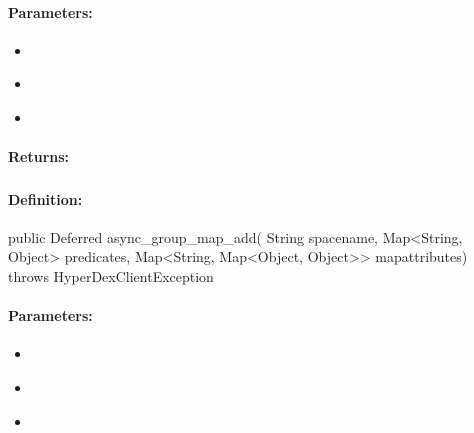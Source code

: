 \paragraph{Parameters:}
\begin{itemize}[noitemsep]
\item {}\\

\item {}\\

\item {}\\

\end{itemize}

\paragraph{Returns:}


\pagebreak
\subsubsection{}
\label{api:java:async_group_map_add}


\paragraph{Definition:}
\begin{javacode}
public Deferred async_group_map_add(
        String spacename,
        Map<String, Object> predicates,
        Map<String, Map<Object, Object>> mapattributes) throws HyperDexClientException
\end{javacode}

\paragraph{Parameters:}
\begin{itemize}[noitemsep]
\item {}\\

\item {}\\

\item {}\\

\end{itemize}

